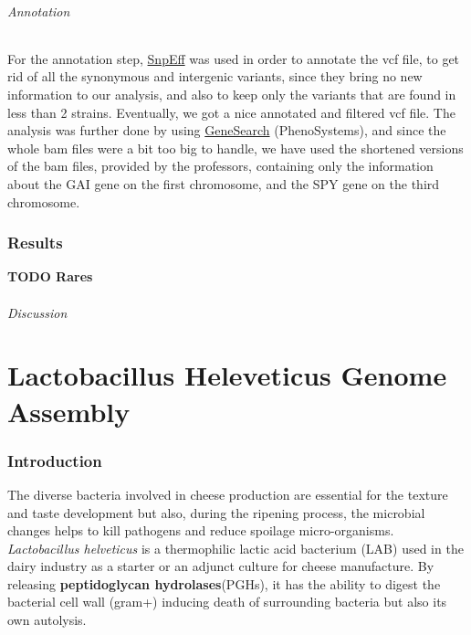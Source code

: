 \documentclass[10pt,a4paper]{article}
\begin{document}
\paragraph{Annotation}
For the annotation step, \href{http://snpeff.sourceforge.net/}{SnpEff} was used in order to annotate the vcf file, to get rid of all the synonymous and intergenic variants, since they bring no new information to our analysis, and also to keep only the variants that are found in less than 2 strains. Eventually, we got a nice annotated and filtered vcf file. The analysis was further done by using \href{http://www.phenosystems.com/www/index.php/products/gensearchngs}{GeneSearch} (PhenoSystems), and since the whole bam files were a bit too big to handle, we have used the shortened versions of the bam files, provided by the professors, containing only the information about the GAI gene on the first chromosome, and the SPY gene on the third chromosome.

\section*{Results} \textbf{TODO Rares}

\paragraph{Discussion}









\newpage
\part*{Lactobacillus Heleveticus Genome Assembly}
\section*{Introduction}


The diverse bacteria involved in cheese production are essential for the texture and taste development but also, during the ripening process, the microbial changes helps to kill pathogens and reduce spoilage micro-organisms. \textit{Lactobacillus helveticus} is a thermophilic lactic acid bacterium (LAB) used in the dairy industry as a starter or an adjunct culture for cheese manufacture. By releasing \textbf{peptidoglycan hydrolases}(PGHs), it has the ability to digest the bacterial cell wall (gram+) inducing death of surrounding bacteria but also its own autolysis. \\
\end{document}
